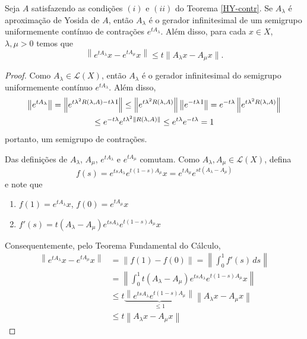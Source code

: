 \begin{lemma}\label{Plem3.4}
Seja $A$ satisfazendo as condições $(i)$ e $(ii)$ do Teorema \ref{HY-contr}. Se $A_\lambda$ é  aproximação de Yosida de $A$, então $A_\lambda$ é o gerador infinitesimal de um semigrupo uniformemente contínuo de contrações $e^{tA_\lambda}$. Além disso, para cada $x\in X$, $\lambda,\mu>0$ temos que
\begin{equation*}
\left\|e^{tA_\lambda}x-e^{tA_\mu}x\right\|\leq t\|A_\lambda x-A_\mu x\|.
\end{equation*}
\end{lemma}
\begin{proof}
Como $A_\lambda \in \mathcal{L}(X)$, então $A_\lambda$ é o gerador infinitesimal do semigrupo uniformemente contínuo $e^{tA_\lambda}$. Além disso,
\begin{multline*}
\left\|e^{tA_\lambda}\right\|
 =\left\|e^{t\lambda^2R(\lambda,A)-t\lambda \operatorname{I}}\right\|
\leq \left\|e^{t\lambda^2R(\lambda,A)}\right\|\left\|e^{-t\lambda \operatorname{I}} \right\|
=e^{-t\lambda }\left\|e^{t\lambda^2R(\lambda,A)}\right\|\\ 
\leq e^{-t\lambda }e^{t\lambda^2\left\|R(\lambda,A)\right\|}
 \leq e^{t\lambda }e^{-t\lambda }=1
\end{multline*}
portanto, um semigrupo de contrações.

Das definições de $A_\lambda$, $A_\mu$, $e^{tA_\lambda}$ e $e^{tA_\mu}$ 
comutam. Como $A_\lambda,  A_\mu\in\mathcal{L}(X)$, defina 
\[f(s)=e^{tsA_\lambda}e^{t(1-s)A_\mu}x=e^{tA_\mu}e^{st(A_\lambda-A_\mu)} \]
e note que
\begin{enumerate}
\item $f(1)=e^{tA_\lambda}x$, $f(0)=e^{tA_\mu}x$
\item $f'(s)=t(A_\lambda-A_\mu)e^{tsA_\lambda}e^{t(1-s)A_\mu}x$
\end{enumerate}
Consequentemente, pelo Teorema Fundamental do Cálculo,
\begin{align*}
\left\|e^{tA_\lambda}x-e^{tA_\mu}x \right\|
& =\left\|f(1)-f(0) \right\|=
\left\|\int_0^1 f'(s)\,ds \right\|\\
& =\left\|\int_0^1 
t(A_\lambda-A_\mu)e^{tsA_\lambda}e^{t(1-s)A_\mu}x\right\|\\
& \leq t\underbrace{\left\|e^{tsA_\lambda}e^{t(1-s)A_\mu}\right\|}_{\leq 1}   \left\|A_\lambda x-A_\mu x\right\|\\
& \leq t \left\|A_\lambda x-A_\mu x\right\|
\end{align*}
\end{proof}

